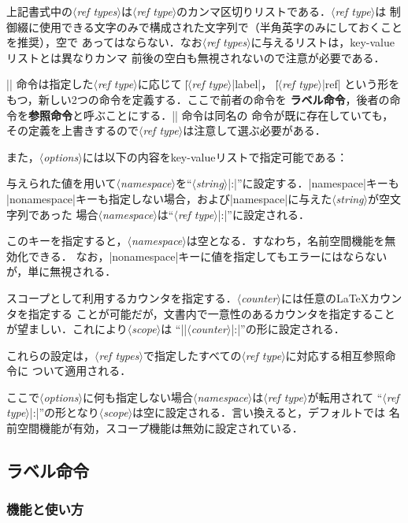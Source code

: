 \documentclass[a4paper,uplatex]{jsarticle}
\newcommand{\Meta}[1]{$\langle$\mbox{}\textit{#1}\mbox{}$\rangle$}
\begin{document}
上記書式中の\Meta{ref types}は\Meta{ref type}のカンマ区切りリストである．\Meta{ref type}は
制御綴に使用できる文字のみで構成された文字列で（半角英字のみにしておくことを推奨），空で
あってはならない．なお\Meta{ref types}に与えるリストは，key-valueリストとは異なりカンマ
前後の空白も無視されないので注意が必要である．

|\newref| 命令は指定した\Meta{ref type}に応じて |\|\Meta{ref type}|label|，
|\|\Meta{ref type}|ref| という形をもつ，新しい2つの命令を定義する．ここで前者の命令を
\textbf{ラベル命令}，後者の命令を\textbf{参照命令}と呼ぶことにする．|\newref| 命令は同名の
命令が既に存在していても，その定義を上書きするので\Meta{ref type}は注意して選ぶ必要がある．

また，\Meta{options}には以下の内容をkey-valueリストで指定可能である：
%
\begin{description}[font=\normalfont]
%
\item[|namespace=|\Meta{string}]
与えられた値を用いて\Meta{namespace}を``\Meta{string}|:|''に設定する．|namespace|キーも
|nonamespace|キーも指定しない場合，および|namespace|に与えた\Meta{string}が空文字列であった
場合\Meta{namespace}は``\Meta{ref type}|:|''に設定される．
%
\item[|nonamespace|]
このキーを指定すると，\Meta{namespace}は空となる．すなわち，名前空間機能を無効化できる．
なお，|nonamespace|キーに値を指定してもエラーにはならないが，単に無視される．
%
\item[|scope=|\Meta{counter}]
スコープとして利用するカウンタを指定する．\Meta{counter}には任意の\LaTeX カウンタを指定する
ことが可能だが，文書内で一意性のあるカウンタを指定することが望ましい．これにより\Meta{scope}は
``|\the|\Meta{counter}|:|''の形に設定される．
\end{description}
%
これらの設定は，\Meta{ref types}で指定したすべての\Meta{ref type}に対応する相互参照命令に
ついて適用される．

ここで\Meta{options}に何も指定しない場合\Meta{namespace}は\Meta{ref type}が転用されて
``\Meta{ref type}|:|''の形となり\Meta{scope}は空に設定される．言い換えると，デフォルトでは
名前空間機能が有効，スコープ機能は無効に設定されている．

\subsection{ラベル命令}

\subsubsection{機能と使い方}
\end{document}
